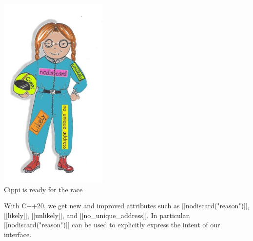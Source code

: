 \begin{center}
\includegraphics[width=0.4\textwidth]{content/3/chapter4/images/44.png}\\
Cippi is ready for the race
\end{center}

With C++20, we get new and improved attributes such as [[nodiscard("reason")]], [[likely]], [[unlikely]], and [[no\_unique\_address]]. In particular, [[nodiscard("reason")]] can be used to explicitly express the intent of our interface.


